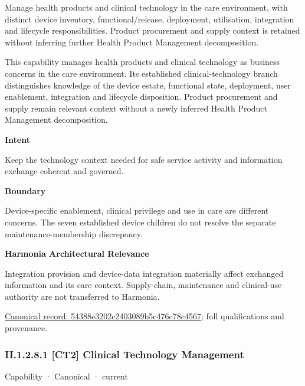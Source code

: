 Manage health products and clinical technology in the care environment, with distinct device inventory, functional/release, deployment, utilisation, integration and lifecycle responsibilities. Product procurement and supply context is retained without inferring further Health Product Management decomposition.



This capability manages health products and clinical technology as business concerns in the care environment. Its established clinical-technology branch distinguishes knowledge of the device estate, functional state, deployment, user enablement, integration and lifecycle disposition. Product procurement and supply remain relevant context without a newly inferred Health Product Management decomposition.



\textbf{Intent}



Keep the technology context needed for safe service activity and information exchange coherent and governed.



\textbf{Boundary}



Device-specific enablement, clinical privilege and use in care are different concerns. The seven established device children do not resolve the separate maintenance-membership discrepancy.



\textbf{Harmonia Architectural Relevance}



Integration provision and device-data integration materially affect exchanged information and its care context. Supply-chain, maintenance and clinical-use authority are not transferred to Harmonia.


{\footnotesize \href{../../../../../../../continuum/strategy/capability/54388e3202c2403089b5c476c78c4567.md}{Canonical record: 54388e3202c2403089b5c476c78c4567}; full qualifications and provenance.}\par
\subsubsection*{II.1.2.8.1 [CT2] Clinical Technology Management}
\label{navigation:II.1.2.8.1}

\label{element:6c91476a45eb4432b1f90b47a4c2ad35}
{\small Capability · Canonical · current}\par

